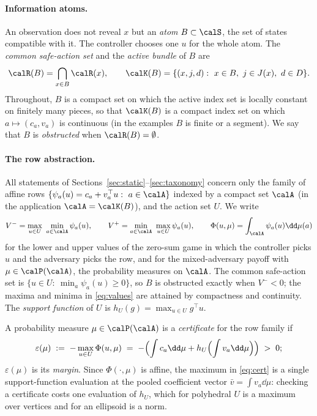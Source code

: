 \paragraph{Information atoms.} An observation does not reveal $x$ but an \emph{atom} $B\subset\calS$, the set of states compatible with it. The controller chooses one $u$ for the whole atom. The \emph{common safe-action set} and the \emph{active bundle} of $B$ are
\begin{equation}\label{eq:common}
\calR(B)=\bigcap_{x\in B}\calR(x),\qquad \calK(B)=\{(x,j,d):\ x\in B,\ j\in J(x),\ d\in D\}.
\end{equation}
Throughout, $B$ is a compact set on which the active index set is locally constant on finitely many pieces, so that $\calK(B)$ is a compact index set on which $a\mapsto(c_a,v_a)$ is continuous (in the examples $B$ is finite or a segment). We say that $B$ is \emph{obstructed} when $\calR(B)=\emptyset$.

\paragraph{The row abstraction.} All statements of Sections~\ref{sec:static}--\ref{sec:taxonomy} concern only the family of affine rows $\{\psi_a(u)=c_a+v_a^\top u:\ a\in\calA\}$ indexed by a compact set $\calA$ (in the application $\calA=\calK(B)$), and the action set $U$. We write
\begin{equation}\label{eq:values}
V^-=\max_{u\in U}\ \min_{a\in\calA}\psi_a(u),\qquad V^+=\min_{a\in\calA}\ \max_{u\in U}\psi_a(u),\qquad
\Phi(u,\mu)=\int_{\calA}\psi_a(u)\dd\mu(a)
\end{equation}
for the lower and upper values of the zero-sum game in which the controller picks $u$ and the adversary picks the row, and for the mixed-adversary payoff with $\mu\in\calP(\calA)$, the probability measures on $\calA$. The common safe-action set is $\{u\in U:\ \min_a\psi_a(u)\ge0\}$, so $B$ is obstructed exactly when $V^-<0$; the maxima and minima in \eqref{eq:values} are attained by compactness and continuity. The \emph{support function} of $U$ is $h_U(g)=\max_{u\in U}g^\top u$.

\begin{definition}\label{def:certificate}
A probability measure $\mu\in\calP(\calA)$ is a \emph{certificate} for the row family if
\begin{equation}\label{eq:cert}
\varepsilon(\mu)\;:=\;-\max_{u\in U}\Phi(u,\mu)\;=\;-\Bigl(\int c_a\dd\mu+h_U\Bigl(\int v_a\dd\mu\Bigr)\Bigr)\;>\;0 ;
\end{equation}
$\varepsilon(\mu)$ is its \emph{margin}. Since $\Phi(\cdot,\mu)$ is affine, the maximum in \eqref{eq:cert} is a single support-function evaluation at the pooled coefficient vector $\bar v=\int v_a\dd\mu$: checking a certificate costs one evaluation of $h_U$, which for polyhedral $U$ is a maximum over vertices and for an ellipsoid is a norm.
\end{definition}

